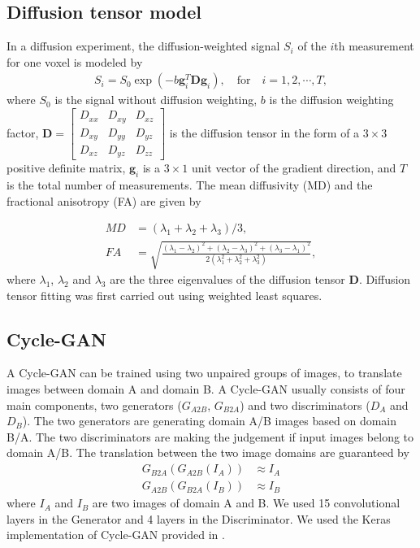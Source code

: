 \documentclass{article}
\begin{document}
\subsection{Diffusion tensor model}

In a diffusion experiment, the diffusion-weighted signal $S_i$ of the $i$th measurement for one voxel  is modeled by
\begin{align}
  S_i = S_0 \exp(-b \mathbf{g}_i^T \mathbf{Dg}_i), \quad \mathrm{for} \quad i = 1, 2, \cdots, T,
\end{align}
where $S_0$ is the signal without diffusion weighting, $b$ is the diffusion weighting factor, $\mathbf{D}=\begin{bmatrix}
  D_{xx} & D_{xy} & D_{xz} \\
  D_{xy} & D_{yy} & D_{yz} \\
  D_{xz} & D_{yz} & D_{zz}
\end{bmatrix}$ is the diffusion tensor in the form of a $3 \times 3$ positive definite matrix, $\mathbf{g}_i$ is a $3 \times 1$ unit vector of the gradient direction, and $T$ is the total number of measurements. The mean diffusivity (MD) and the fractional anisotropy (FA) are given by

\begin{align}
  MD&=(\lambda_1+\lambda_2+\lambda_3)/3, \\
  FA&=\sqrt{\frac{(\lambda_1-\lambda_2)^2+(\lambda_2-\lambda_3)^2+(\lambda_3-\lambda_1)^2}{2(\lambda_1^2+\lambda_2^2+\lambda_3^2)}},
\end{align}
where $\lambda_1$, $\lambda_2$ and $\lambda_3$ are the three eigenvalues of the diffusion tensor $\mathbf{D}$.
Diffusion tensor fitting was first carried out using weighted least squares.


\subsection{Cycle-GAN}
A Cycle-GAN \cite{zhu2017unpaired} can be trained using two unpaired groups of images, to translate images between domain A and domain B. A Cycle-GAN usually consists of four main components, two generators ($G_{A2B}$, $G_{B2A}$) and two discriminators ($D_A$ and $D_B$). The two generators are generating domain A/B images based on domain B/A. The two discriminators are making the judgement if input images belong to domain A/B. The translation between the two image domains are guaranteed by
\begin{align}
  G_{B2A}(G_{A2B}(I_A)) &\approx I_A \\
  G_{A2B}(G_{B2A}(I_B)) &\approx I_B
\end{align}
where $I_A$ and $I_B$ are two images of domain A and B. We used 15 convolutional layers in the Generator and 4 layers in the Discriminator. We used the Keras implementation of Cycle-GAN provided in \cite{welander2018generative}.
\end{document}
